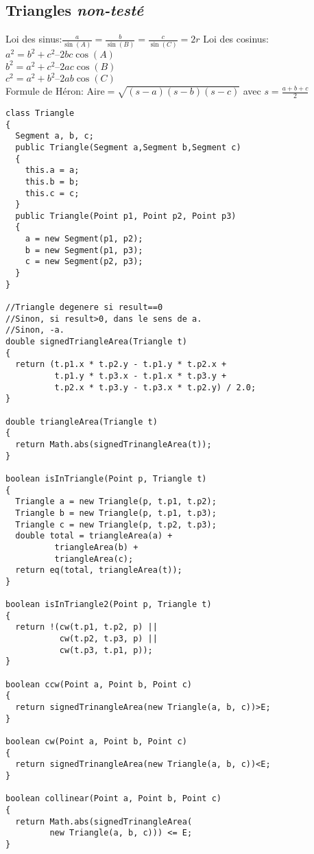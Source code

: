 \subsection{Triangles {\footnotesize \textit{non-testé}}}
Loi des sinus:$\frac{a}{\sin(A)}=\frac{b}{\sin(B)}=\frac{c}{\sin(C)}=2r$
Loi des cosinus:\\
$a^2 = b^2 + c^2 – 2bc\cos(A)$\\
$b^2 = a^2 + c^2 – 2ac\cos(B)$\\
$c^2 = a^2 + b^2 – 2ab\cos(C)$\\
Formule de Héron: Aire$=\sqrt{(s-a)(s-b)(s-c)}$ avec $s=\frac{a+b+c}{2}$
\begin{lstlisting}
class Triangle
{
  Segment a, b, c;
  public Triangle(Segment a,Segment b,Segment c)
  {
    this.a = a;
    this.b = b;
    this.c = c;
  }
  public Triangle(Point p1, Point p2, Point p3)
  {
    a = new Segment(p1, p2);
    b = new Segment(p1, p3);
    c = new Segment(p2, p3);
  }
}

//Triangle degenere si result==0
//Sinon, si result>0, dans le sens de a.
//Sinon, -a.
double signedTriangleArea(Triangle t)
{
  return (t.p1.x * t.p2.y - t.p1.y * t.p2.x +
          t.p1.y * t.p3.x - t.p1.x * t.p3.y +
          t.p2.x * t.p3.y - t.p3.x * t.p2.y) / 2.0;
}
	
double triangleArea(Triangle t)
{
  return Math.abs(signedTrinangleArea(t));
}

boolean isInTriangle(Point p, Triangle t)
{
  Triangle a = new Triangle(p, t.p1, t.p2);
  Triangle b = new Triangle(p, t.p1, t.p3);
  Triangle c = new Triangle(p, t.p2, t.p3);
  double total = triangleArea(a) +
		  triangleArea(b) +
		  triangleArea(c);
  return eq(total, triangleArea(t));
}

boolean isInTriangle2(Point p, Triangle t)
{
  return !(cw(t.p1, t.p2, p) ||
           cw(t.p2, t.p3, p) ||
           cw(t.p3, t.p1, p));
}

boolean ccw(Point a, Point b, Point c)
{
  return signedTrinangleArea(new Triangle(a, b, c))>E;
}

boolean cw(Point a, Point b, Point c)
{
  return signedTrinangleArea(new Triangle(a, b, c))<E;
}

boolean collinear(Point a, Point b, Point c)
{
  return Math.abs(signedTrinangleArea(
         new Triangle(a, b, c))) <= E;
}
\end{lstlisting}
